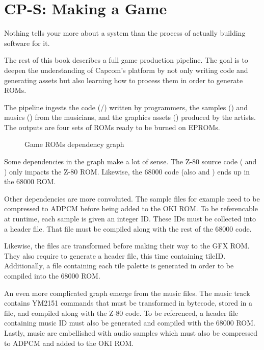 \chapter{CP-S: Making a Game}

Nothing tells your more about a system than the process of actually building software for it.

The rest of this book describes a full game production pipeline. The goal is to deepen the understanding of Capcom's platform by not only writing code and generating assets but also learning how to process them in order to generate ROMs.

The pipeline ingests the code (/) written by programmers, the samples () and musics () from the musicians, and the graphics assets () produced by the artists. The outputs are four sets of ROMs ready to be burned on EPROMs. 

 \begin{figure}[H]
\caption*{Game ROMs dependency graph}
\end{figure}

Some dependencies in the graph make a lot of sense. The Z-80 source code ( and ) only impacts the Z-80 ROM. Likewise, the 68000 code (also  and ) ends up in the 68000 ROM.

Other dependencies are more convoluted. The  sample files for example need to be compressed to ADPCM before being added to the OKI ROM. To be referencable at runtime, each sample is given an integer ID. These IDs must be collected into a  header file. That file must be compiled along with the rest of the 68000 code.

Likewise, the  files are transformed before making their way to the GFX ROM. They also require to generate a  header file, this time containing tileID. Additionally, a  file containing each tile palette is generated in order to be compiled into the 68000 ROM. 

An even more complicated graph emerge from the music  files. The music track contains YM2151 commands that must be transformed in bytecode, stored in a  file, and compiled along with the Z-80 code. To be referenced, a header file containing music ID must also be generated and compiled with the 68000 ROM. Lastly, music are embellished with audio samples which must also be compressed to ADPCM and added to the OKI ROM.

